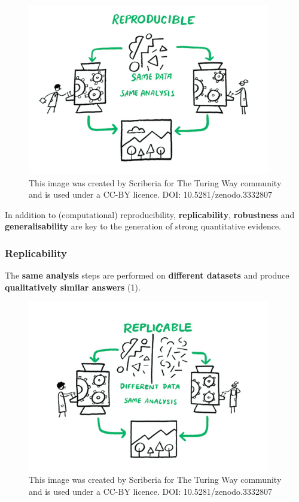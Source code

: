 \documentclass[
  letterpaper,
  DIV=11,
  numbers=noendperiod,
  oneside]{scrreprt}
\begin{document}
\begin{figure}

{\centering \includegraphics[width=4.16667in,height=\textheight]{./images/paste-97E0048A.png}

}

\caption{\label{fig-reproducibility}This image was created by Scriberia
for The Turing Way community and is used under a CC-BY licence. DOI:
10.5281/zenodo.3332807}

\end{figure}

In addition to (computational) reproducibility, \textbf{replicability},
\textbf{robustness} and \textbf{generalisability} are key to the
generation of strong quantitative evidence.

\hypertarget{replicability}{%
\subsubsection{Replicability}\label{replicability}}

The \textbf{same analysis} steps are performed on \textbf{different
datasets} and produce \textbf{qualitatively similar answers} (1).

\begin{figure}

{\centering \includegraphics[width=4.16667in,height=\textheight]{./images/paste-5D367441.png}

}

\caption{\label{fig-replicability}This image was created by Scriberia
for The Turing Way community and is used under a CC-BY licence. DOI:
10.5281/zenodo.3332807}

\end{figure}
\end{document}
